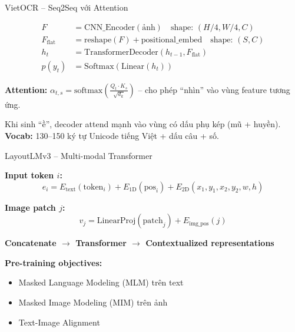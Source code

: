 \documentclass[aspectratio=169, 10pt]{beamer}
\begin{document}
\begin{frame}{VietOCR -- Seq2Seq với Attention}
 \begin{infobox}
 \end{infobox}
 \vspace{0.3cm}

 \begin{align*}
 F &= \text{CNN\_Encoder}(\text{ảnh}) \quad \text{shape: } (H/4, W/4, C) \\
 F_{\text{flat}} &= \text{reshape}(F) + \text{positional\_embed} \quad \text{shape: } (S, C) \\
 h_t &= \text{TransformerDecoder}(h_{t-1}, F_{\text{flat}}) \\
 p(y_t) &= \text{Softmax}(\text{Linear}(h_t))
 \end{align*}
 \vspace{0.2cm}

 \textbf{Attention:} $\alpha_{t,s} = \text{softmax}\left(\frac{Q_t \cdot K_s}{\sqrt{d_k}}\right)$ -- cho phép ``nhìn'' vào vùng feature tương ứng.

 \vspace{0.2cm}
 \begin{successbox}
 Khi sinh ``ề'', decoder attend mạnh vào vùng có dấu phụ kép (mũ + huyền). \\
 \textbf{Vocab:} 130--150 ký tự Unicode tiếng Việt + dấu câu + số.
 \end{successbox}
\end{frame}

\begin{frame}{LayoutLMv3 -- Multi-modal Transformer}
 \begin{infobox}
 \end{infobox}
 \vspace{0.3cm}

 \textbf{Input token $i$:}
 \[e_i = E_{\text{text}}(\text{token}_i) + E_{\text{1D}}(\text{pos}_i) + E_{\text{2D}}(x_1, y_1, x_2, y_2, w, h)\]

 \textbf{Image patch $j$:}
 \[v_j = \text{LinearProj}(\text{patch}_j) + E_{\text{img\_pos}}(j)\]

 \textbf{Concatenate $\rightarrow$ Transformer $\rightarrow$ Contextualized representations}
 \vspace{0.3cm}

 \textbf{Pre-training objectives:}
 \begin{itemize}
 \item[$\bullet$] Masked Language Modeling (MLM) trên text
 \item[$\bullet$] Masked Image Modeling (MIM) trên ảnh
 \item[$\bullet$] Text-Image Alignment
 \end{itemize}
\end{frame}
\end{document}
